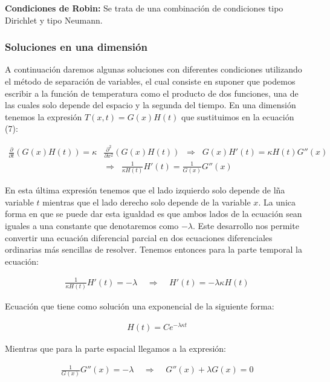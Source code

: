 \documentclass[12pt]{article}
\begin{document}
\textbf{Condiciones de Robin: }Se trata de una combinación de condiciones tipo Dirichlet y tipo Neumann. \\

\subsubsection{Soluciones en una dimensión}

A continuación daremos algunas soluciones con diferentes condiciones utilizando el método de separación de variables, el cual consiste en suponer que podemos escribir a la función de temperatura como el producto de dos funciones, una de las cuales solo depende del espacio y la segunda del tiempo. En una dimensión tenemos la expresión $T(x,t) = G(x)H(t)$ que sustituimos en la ecuación (7):

\begin{align*}
    \frac{\partial }{\partial t}\left(G(x)H(t)\right) = \kappa&\frac{\partial^2 }{\partial x^2}\left(G(x)H(t)\right) \;\; \Rightarrow \;\; G(x)H'(t) = \kappa H(t)G''(x) \\
    &\Rightarrow \;\; \frac{1}{\kappa H(t)}H'(t) = \frac{1}{G(x)}G''(x)
\end{align*}

En esta última expresión tenemos que el lado izquierdo solo depende de lña variable $t$ mientras que el lado derecho solo depende de la variable $x$. La unica forma en que se puede dar esta igualdad es que ambos lados de la ecuación sean iguales a una constante que denotaremos como $-\lambda$. Este desarrollo nos permite convertir una ecuación diferencial parcial en dos ecuaciones diferenciales ordinarias más sencillas de resolver. Tenemos entonces para la parte temporal la ecuación:

\begin{align*}
    \frac{1}{\kappa H(t)}H'(t) = -\lambda \;\;\;\; \Rightarrow \;\;\;\; H'(t) = -\lambda\kappa H(t)
\end{align*}

Ecuación que tiene como solución una exponencial de la siguiente forma:

\begin{align}
    H(t) = Ce^{-\lambda\kappa t}
\end{align}

Mientras que para la parte espacial llegamos a la expresión:

\begin{align*}
    \frac{1}{G(x)}G''(x) = -\lambda \;\;\;\; \Rightarrow \;\;\;\; G''(x) + \lambda G(x) = 0
\end{align*}
\end{document}
